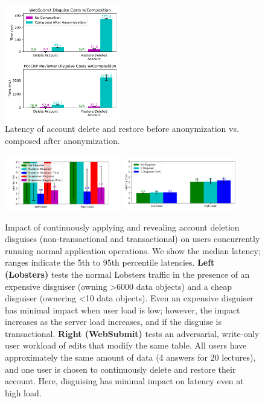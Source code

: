 \begin{figure}[t]
    \centering
    \includegraphics[width=0.45\textwidth]{figs/composition_stats}
    \caption{Latency of account delete and restore before anonymization vs. composed after anonymization.}
    \label{f:composition}
\end{figure}

\begin{figure}[t]
    \centering
        \includegraphics[width=0.45\textwidth]{figs/lobsters_concurrent_results}
        \includegraphics[width=0.45\textwidth]{figs/websubmit_concurrent_results}
    \caption{Impact of continuously applying and revealing account deletion disguises (non-transactional and transactional) on users concurrently running
    normal application operations. We show the median latency; ranges indicate the 5th to 95th
    percentile latencies.
    \textbf{Left (Lobsters)} tests the normal Lobsters traffic in the presence of an expensive
    disguiser (owning >6000 data objects) and a cheap disguiser (ownering <10 data objects). Even an expensive disguiser has minimal impact when user load is low; however, the impact increases as the server load increases, and if the
    disguise is transactional.
    \textbf{Right (WebSubmit)} tests an adversarial, write-only user workload of edits that
    modify the same table. All users have approximately the same amount of data (4 answers for 20
    lectures), and one user is chosen to continuously delete and restore their account. Here,
    disguising has minimal impact on latency even at high load.
    }
    \label{fig:concurrent}
\end{figure}

